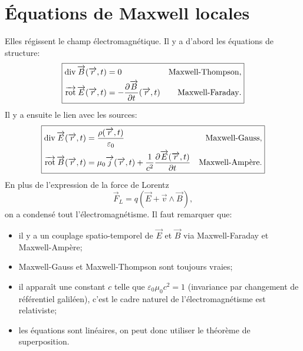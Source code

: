 \section{Équations de Maxwell locales}

Elles régissent le champ électromagnétique. Il y a d'abord les équations de structure:
\begin{equation*}
    \boxed{
        \begin{aligned}
            \operatorname{div}\protect\overrightarrow{{B}}(\protect\overrightarrow{{r}},t)&=0&\text{Maxwell-Thompson},\\
            \operatorname{\overrightarrow{\text{rot}}}\protect\overrightarrow{{E}}(\protect\overrightarrow{{r}},t)&=-\frac{\partial\protect\overrightarrow{{B}}}{\partial t}(\protect\overrightarrow{{r}},t)&\text{Maxwell-Faraday}.
        \end{aligned}
    }
\end{equation*}
Il y a ensuite le lien avec les sources:
\begin{equation*}
    \boxed{
        \begin{aligned}
            \operatorname{div}\protect\overrightarrow{{E}}(\protect\overrightarrow{{r}},t)&=\frac{\rho(\protect\overrightarrow{{r}},t)}{\varepsilon_0}&\text{Maxwell-Gauss},\\
            \operatorname{\overrightarrow{\text{rot}}}\protect\overrightarrow{{B}}(\protect\overrightarrow{{r}},t)&=\mu_0\protect\overrightarrow{{j}}(\protect\overrightarrow{{r}},t)+\frac{1}{c^{2}}\frac{\partial\protect\overrightarrow{{E}}(\protect\overrightarrow{{r}},t)}{\partial t}&\text{Maxwell-Ampère}.
        \end{aligned}
    }
\end{equation*}
En plus de l'expression de la force de Lorentz
\begin{equation*}
    \boxed{
        \vec{F}_L=q(\vec{E}+\vec{v}\wedge\vec{B}),
    }
\end{equation*}
on a condensé tout l'électromagnétisme. Il faut remarquer que:
\begin{itemize}
    \item il y a un couplage spatio-temporel de $\vec{E}$ et $\vec{B}$ via Maxwell-Faraday et Maxwell-Ampère;
    \item Maxwell-Gauss et Maxwell-Thompson sont toujours vraies;
    \item il apparaît une constant $c$ telle que $\varepsilon_0\mu_0 c^{2}=1$ (invariance par changement de référentiel galiléen), c'est le cadre naturel de l'électromagnétisme est relativiste;
    \item les équations sont linéaires, on peut donc utiliser le théorème de superposition.
\end{itemize}